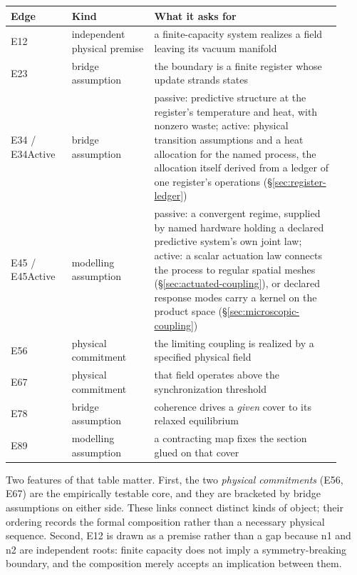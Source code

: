 \documentclass[11pt]{article}
\begin{document}
\begin{center}
\begin{tabular}{@{}>{\raggedright\arraybackslash}p{0.17\linewidth}>{\raggedright\arraybackslash}p{0.23\linewidth}>{\raggedright\arraybackslash}p{0.52\linewidth}@{}}
\hline
Edge & Kind & What it asks for \\
\hline
E12 & independent physical premise & a finite-capacity system realizes a field leaving its vacuum manifold \\
E23 & bridge assumption & the boundary is a finite register whose update strands states \\
E34 / E34Active & bridge assumption & passive: predictive structure at the register's temperature and heat, with nonzero waste; active: physical transition assumptions and a heat allocation for the named process, the allocation itself derived from a ledger of one register's operations (\S\ref{sec:register-ledger}) \\
E45 / E45Active & modelling assumption & passive: a convergent regime, supplied by named hardware holding a declared predictive system's own joint law; active: a scalar actuation law connects the process to regular spatial meshes (\S\ref{sec:actuated-coupling}), or declared response modes carry a kernel on the product space (\S\ref{sec:microscopic-coupling}) \\
E56 & physical commitment & the limiting coupling is realized by a specified physical field \\
E67 & physical commitment & that field operates above the synchronization threshold \\
E78 & bridge assumption & coherence drives a \emph{given} cover to its relaxed equilibrium \\
E89 & modelling assumption & a contracting map fixes the section glued on that cover \\
\hline
\end{tabular}
\end{center}

\noindent
Two features of that table matter. First, the two \emph{physical commitments}
(E56, E67) are the empirically testable core, and they are bracketed by
bridge assumptions on either side. These links connect distinct kinds of
object; their ordering records the formal composition rather than a necessary
physical sequence. Second, E12 is drawn as a premise rather
than a gap because n1 and n2 are independent roots: finite capacity does not
imply a symmetry-breaking boundary, and the composition merely accepts an
implication between them.
\end{document}
